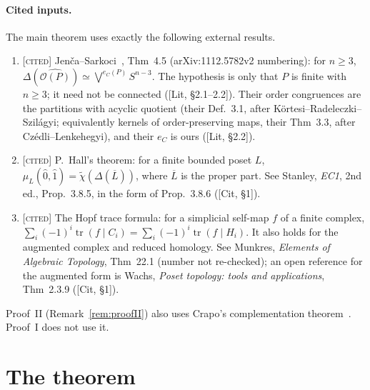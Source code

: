 \documentclass[11pt]{article}
\theoremstyle{definition}
\theoremstyle{remark}
\newcommand{\OP}{\mathcal O}
\newcommand{\st}[1]{\textup{[\textsc{#1}]}}
\begin{document}
\paragraph{Cited inputs.} The main theorem uses exactly the following
external results.
\begin{enumerate}[label=(\Alph*)]
\item\label{in:JS} \st{cited} Jen\v{c}a--Sarkoci~\cite{JencaSarkoci},
  Thm~4.5 (arXiv:1112.5782v2 numbering): for $n\ge3$,
  $\Delta(\widehat{\OP(P)})\simeq\bigvee^{e_C(P)}S^{n-3}$. The hypothesis
  is only that $P$ is finite with $n\ge3$; it need not be connected
  ([Lit, \S2.1--2.2]). Their order congruences are the partitions with
  acyclic quotient (their Def.~3.1, after K\"ortesi--Radeleczki--Szil\'agyi;
  equivalently kernels of order-preserving maps, their Thm~3.3, after
  Cz\'edli--Lenkehegyi), and their
  $e_C$ is ours ([Lit, \S2.2]).
\item\label{in:Hall} \st{cited} P.~Hall's theorem: for a finite bounded
  poset $L$, $\mu_L(\hat0,\hat1)=\widetilde\chi(\Delta(\overline L))$, where
  $\overline L$ is the proper part. See Stanley, \emph{EC1}, 2nd ed.,
  Prop.~3.8.5, in the form of Prop.~3.8.6 ([Cit, \S1]).
\item\label{in:Hopf} \st{cited} The Hopf trace formula: for a simplicial
  self-map $f$ of a finite complex,
  $\sum_i(-1)^i\operatorname{tr}(f\mid C_i)=\sum_i(-1)^i\operatorname{tr}(f\mid H_i)$.
  It also holds for the augmented complex and reduced homology. See
  Munkres, \emph{Elements of Algebraic Topology}, Thm~22.1 (number not
  re-checked); an open reference for the augmented form is Wachs,
  \emph{Poset topology: tools and applications}, Thm~2.3.9 ([Cit, \S1]).
\end{enumerate}
Proof~II (Remark~\ref{rem:proofII}) also uses Crapo's complementation
theorem~\cite{Crapo}. Proof~I does not use it.

\section{The theorem}\label{sec:theorem}
\end{document}

